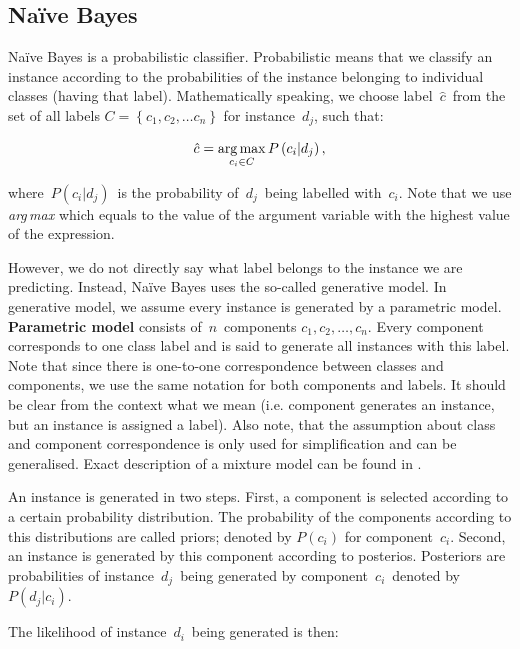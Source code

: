 \subsection{Na\"{i}ve Bayes}

Na\"{i}ve Bayes is a probabilistic classifier.
Probabilistic means that we classify an instance according to the probabilities of the instance belonging to individual classes (having that label).
Mathematically speaking, we choose label~$\hat{c}$~from the set of all labels $C=\left\{c_1,c_2,\dots c_n\right\}$ for instance~$d_j$, such that:

\begin{equation}
	\label{eq:argmax}
	\hat{c} = \operatorname*{arg\,max}_{c_i \in C} P\left(c_i  | d_j \right),
\end{equation}

where~$P\left(c_i | d_j\right)$~is the probability of~$d_j$~being labelled with~$c_i$.
Note that we use \textit{arg\,max} which equals to the value of the argument variable
with the highest value of the expression.

However, we do not directly say what label belongs to the instance we are predicting.
Instead, Na\"{i}ve Bayes uses the so-called generative model.
In generative model, we assume every instance is generated by a parametric model.
\textbf{Parametric model} consists of~$n$~components $c_1, c_2,\ldots, c_n$.
Every component corresponds to one class label
and is said to generate all instances with this label.
Note that since there is one-to-one correspondence between classes and components,
we use the same notation for both components and labels.
It should be clear from the context what we mean (i.e. component generates an instance,
but an instance is assigned a label).
Also note, that the assumption about class and component correspondence is only used for simplification and can be generalised.
Exact description of a mixture model can be found in 
\citet{DBLP:journals/corr/cmp-lg-9705005}.

An instance is generated in two steps.
First, a component is selected according to a certain probability distribution.
The probability of the components according to this distributions are
called priors; denoted by $P\left(c_i\right)$ for component~$c_i$.
Second, an instance is generated by this component according to posterios.
Posteriors are probabilities of instance~$d_j$~being generated by component~$c_i$~denoted by~$P\left(d_j|c_i\right)$.

The likelihood of instance~$d_i$~being generated is then:

